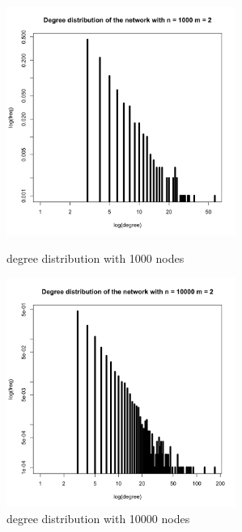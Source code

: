 \documentclass[draftcls,12pt,onecolumn]{IEEEtran}
\begin{document}
\begin{figure}[htbp]
\centering
\begin{minipage}[t]{0.48\textwidth}
\centering
\includegraphics[width=7.5cm]{img/2_g_1_degree1}
\caption{degree distribution with 1000 nodes}
\end{minipage}
\begin{minipage}[t]{0.48\textwidth}
\centering
\includegraphics[width=7.5cm]{img/2_g_1_degree2}
\caption{degree distribution with 10000 nodes}
\end{minipage}
\end{figure}
\end{document}
